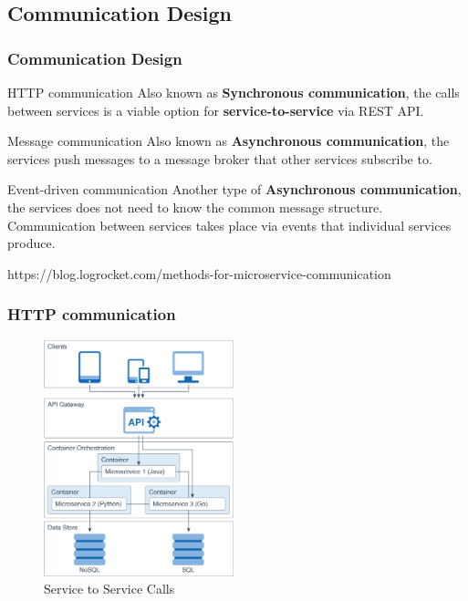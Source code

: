\documentclass{beamer}
\begin{document}
		
	\subsection {Communication Design}
		\begin{frame}[label=cd]
			\frametitle{Communication Design}
				\begin{block} {HTTP communication}
					Also known as \textbf{Synchronous communication}, the calls between services is a viable option for \textbf{service-to-service} via REST API.
				\end{block}
				
				\vspace{2mm}
				\begin{block} {Message communication}
					Also known as \textbf{Asynchronous communication}, the services push messages to a message broker that other services subscribe to.
				\end{block}
			
			\vspace{2mm}
			\begin{block} {Event-driven communication}
				Another type of \textbf{Asynchronous communication}, the services does not need to know the common message structure. Communication between services takes place via events that individual services produce.
			\end{block}
		
		\vspace{5mm}
		\tiny {https://blog.logrocket.com/methods-for-microservice-communication}
		\end{frame}
	
	\begin{frame}
		\frametitle{HTTP communication}
			\begin{figure}[h]
				\includegraphics[width=55mm, height=60mm scale=1]{img/microservice_architecture.png}
				\caption{Service to Service Calls}
			\end{figure}
	\end{frame}
	
\end{document}
